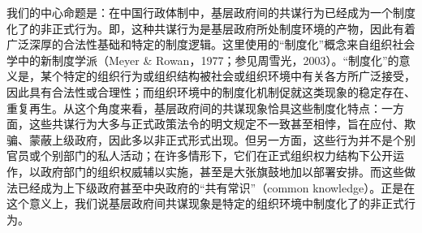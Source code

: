 \documentclass[12pt,a4paper]{article}
\begin{document}
我们的中心命题是：在中国行政体制中，基层政府间的共谋行为已经成为一个制度化了的非正式行为。即，这种共谋行为是基层政府所处制度环境的产物，因此有着广泛深厚的合法性基础和特定的制度逻辑。这里使用的“制度化”概念来自组织社会学中的新制度学派（Meyer \& Rowan，1977；参见周雪光，2003）。“制度化”的意义是，某个特定的组织行为或组织结构被社会或组织环境中有关各方所广泛接受，因此具有合法性或合理性；而组织环境中的制度化机制促就这类现象的稳定存在、重复再生。从这个角度来看，基层政府间的共谋现象恰具这些制度化特点：一方面，这些共谋行为大多与正式政策法令的明文规定不一致甚至相悖，旨在应付、欺骗、蒙蔽上级政府，因此多以非正式形式出现。但另一方面，这些行为并不是个别官员或个别部门的私人活动；在许多情形下，它们在正式组织权力结构下公开运作，以政府部门的组织权威辅以实施，甚至是大张旗鼓地加以部署安排。而这些做法已经成为上下级政府甚至中央政府的“共有常识”（common knowledge）。正是在这个意义上，我们说基层政府间共谋现象是特定的组织环境中制度化了的非正式行为。
\par{}
\end{document}
